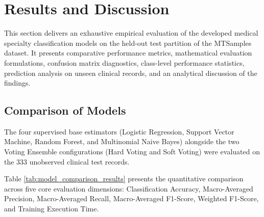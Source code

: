 \clearpage

\section{Results and Discussion}

This section delivers an exhaustive empirical evaluation of the developed medical specialty classification models on the held-out test partition of the MTSamples dataset. It presents comparative performance metrics, mathematical evaluation formulations, confusion matrix diagnostics, class-level performance statistics, prediction analysis on unseen clinical records, and an analytical discussion of the findings.

\subsection{Comparison of Models}

The four supervised base estimators (Logistic Regression, Support Vector Machine, Random Forest, and Multinomial Naive Bayes) alongside the two Voting Ensemble configurations (Hard Voting and Soft Voting) were evaluated on the 333 unobserved clinical test records. 

Table \ref{tab:model_comparison_results} presents the quantitative comparison across five core evaluation dimensions: Classification Accuracy, Macro-Averaged Precision, Macro-Averaged Recall, Macro-Averaged F1-Score, Weighted F1-Score, and Training Execution Time.

\begin{table}[H]
\centering
\small
{}
\caption{Empirical Performance Comparison of Base Models and Voting Ensembles (8 Specialties)}
\label{tab:model_comparison_results}
\end{table}

